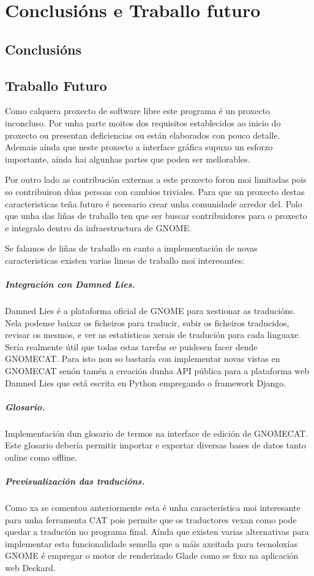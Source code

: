 \chapter{Conclusións e Traballo futuro}

\section{Conclusións}

\section{Traballo Futuro}
Como calquera proxecto de software libre este programa é un proxecto inconcluso. Por unha parte moitos dos requisitos establecidos ao inicio do proxecto ou presentan deficiencias ou están elaborados con pouco detalle. Ademais aínda que neste proxecto a interface gráfica supuxo un esforzo importante, aínda hai algunhas partes que poden ser mellorables.

Por outro lado as contribución externas a este proxecto foron moi limitadas pois so contribuiron dúas persoas con cambios triviales. Para que un proxecto destas caracteristicas teña futuro é necesario crear unha comunidade arredor del. Polo que unha das liñas de traballo ten que ser buscar contribuidores para o proxecto e integralo dentro da infraestructura de GNOME.

Se falamos de liñas de traballo en canto a implementación de novas caracteristicas existen varias lineas de traballo moi interesantes:

\paragraph{Integración con Damned Lies.} Damned Lies é a plataforma oficial de GNOME para xestionar as traducións. Nela podense baixar os ficheiros para traducir, subir os ficheiros traducidos, revisar os mesmos, e ver as estatisticas xerais de tradución para cada linguaxe. Sería realmente útil que todas estas tarefas se puidesen facer dende GNOMECAT. Para isto non so bastaría con implementar novas vistas en GNOMECAT senón tamén a creación dunha API pública para a plataforma web Damned Lies que está escrita en Python empregando o framework Django.

\paragraph{Glosario.} Implementación dun glosario de termos na interface de edición de GNOMECAT. Este glosario debería permitir importar e exportar diversas bases de datos tanto online como offline.

\paragraph{Previsualización das traducións.} Como xa se comentou anteriormente esta é unha caracteristica moi interesante para unha ferramenta CAT pois permite que os traductores vexan como pode quedar a tradución no programa final. Aínda que existen varias alternativas para implementar esta funcionalidade semella que a máis axeitada para tecnoloxías GNOME é empregar o motor de renderizado Glade como se fixo na aplicación web Deckard.
